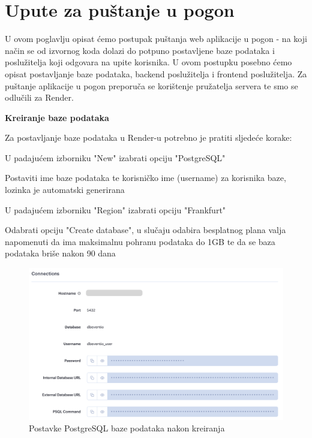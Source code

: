			\eject 
		
		\section{Upute za puštanje u pogon}
		
			U ovom poglavlju opisat ćemo postupak puštanja web aplikacije u pogon - na koji način se od izvornog koda dolazi do potpuno postavljene baze podataka i poslužitelja koji odgovara na upite korisnika. U ovom postupku posebno ćemo opisat postavljanje baze podataka, backend poslužitelja i frontend poslužitelja. Za puštanje aplikacije u pogon preporuča se korištenje pružatelja servera te smo se odlučili za Render.
			
			\textbf{Kreiranje baze podataka}
			
			Za postavljanje baze podataka u Render-u potrebno je pratiti sljedeće korake:
			
			\begin{packed_enum}
				
				\item  U padajućem izborniku "New" izabrati opciju "PostgreSQL"
				\item	Postaviti ime baze podataka te korisničko ime (username) za korisnika baze, lozinka je automatski generirana
				\item	U padajućem izborniku "Region" izabrati opciju "Frankfurt"
				\item	Odabrati opciju "Create database", u slučaju odabira besplatnog plana valja napomenuti da ima maksimalnu pohranu podataka do 1GB te da se baza podataka briše nakon 90 dana 

			\end{packed_enum}
		
			\begin{figure}[H]
				\includegraphics[scale=0.45]{deploy/baza.png}
				\centering
				\caption{Postavke PostgreSQL baze podataka nakon kreiranja}
				\label{fig:promjene}
			\end{figure}
			

